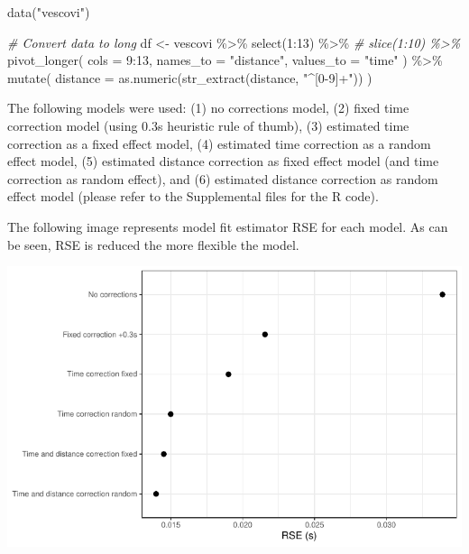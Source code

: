 \documentclass[fleqn,10pt,lineno]{wlpeerj} %
\newenvironment{Shaded}{\begin{snugshade}}{\end{snugshade}}
\newcommand{\AttributeTok}[1]{\textcolor[rgb]{0.77,0.63,0.00}{#1}}
\newcommand{\CommentTok}[1]{\textcolor[rgb]{0.56,0.35,0.01}{\textit{#1}}}
\newcommand{\DecValTok}[1]{\textcolor[rgb]{0.00,0.00,0.81}{#1}}
\newcommand{\FunctionTok}[1]{\textcolor[rgb]{0.00,0.00,0.00}{#1}}
\newcommand{\NormalTok}[1]{#1}
\newcommand{\OtherTok}[1]{\textcolor[rgb]{0.56,0.35,0.01}{#1}}
\newcommand{\SpecialCharTok}[1]{\textcolor[rgb]{0.00,0.00,0.00}{#1}}
\newcommand{\StringTok}[1]{\textcolor[rgb]{0.31,0.60,0.02}{#1}}
\begin{document}
\begin{Shaded}
\begin{Highlighting}[]
\FunctionTok{data}\NormalTok{(}\StringTok{"vescovi"}\NormalTok{)}

\CommentTok{\# Convert data to long}
\NormalTok{df }\OtherTok{\textless{}{-}}\NormalTok{ vescovi }\SpecialCharTok{\%\textgreater{}\%}
  \FunctionTok{select}\NormalTok{(}\DecValTok{1}\SpecialCharTok{:}\DecValTok{13}\NormalTok{) }\SpecialCharTok{\%\textgreater{}\%}
  \CommentTok{\# slice(1:10) \%\textgreater{}\%}
  \FunctionTok{pivot\_longer}\NormalTok{(}
    \AttributeTok{cols =} \DecValTok{9}\SpecialCharTok{:}\DecValTok{13}\NormalTok{,}
    \AttributeTok{names\_to =} \StringTok{"distance"}\NormalTok{,}
    \AttributeTok{values\_to =} \StringTok{"time"}
\NormalTok{  ) }\SpecialCharTok{\%\textgreater{}\%}
  \FunctionTok{mutate}\NormalTok{(}
    \AttributeTok{distance =} \FunctionTok{as.numeric}\NormalTok{(}\FunctionTok{str\_extract}\NormalTok{(distance, }\StringTok{"\^{}[0{-}9]+"}\NormalTok{))}
\NormalTok{  )}
\end{Highlighting}
\end{Shaded}

The following models were used: (1) no corrections model, (2) fixed time correction model (using 0.3s heuristic rule of thumb), (3) estimated time correction as a fixed effect model, (4) estimated time correction as a random effect model, (5) estimated distance correction as fixed effect model (and time correction as random effect), and (6) estimated distance correction as random effect model (please refer to the Supplemental files for the R code).

The following image represents model fit estimator RSE for each model. As can be seen, RSE is reduced the more flexible the model.

\begin{center}\includegraphics[width=0.9\linewidth]{paper_files/figure-latex/unnamed-chunk-57-1} \end{center}
\end{document}
